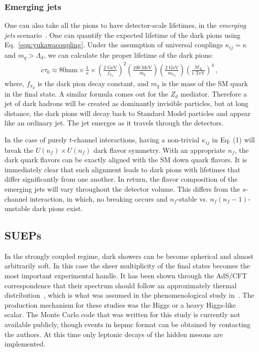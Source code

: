 \subsubsection{Emerging jets}
One can also take all the pions to have detector-scale lifetimes, in the {\em emerging jets} scenario~\cite{Schwaller:2015gea}. One can quantify the expected lifetime of the dark pions using Eq.~\ref{eqn:yukawacoupling}.  Under the assumption of universal couplings 
$\kappa_{ij} = \kappa$ and $m_{q} > \Lambda_{d}$, we can calculate the proper lifetime of the dark pions:
%
\begin{align}
	c \tau_{0} \approx 80 \mathrm{mm} \times \frac{1}{\kappa} \times \left( \frac{2 \;\mathrm{GeV}}{f_{\pi_{d}}} \right)^2 \left( \frac{100 \;\mathrm{MeV}}{m_{q}} \right) \left( \frac{2\; \mathrm{GeV}}{m_{\pi_{d} }} \right) \left( \frac{M_{X}}{1 \;\mathrm{TeV}} \right)^4 \,,
\end{align} 
where, $f_{\pi_{d}}$ is the dark pion decay constant, and $m_q$ is the mass of the SM quark in the final state.  A similar formula comes out for the $Z_d$ mediator. Therefore a jet of dark hadrons will be created as dominantly invisible particles, but at long distance, the dark pions will decay back to Standard Model particles and appear like an ordinary jet. The jet emerges as it travels through the detectors.


In the case of purely $t$-channel interactions, having a non-trivial $\kappa_{ij}$ in Eq. (1) will break the $U(n_{f}) \times U(n_{f})$ dark flavor symmetry. With an appropriate $n_{f}$, the dark quark flavors can be exactly aligned with the SM down quark flavors. It is immediately clear that such alignment leads to dark pions with lifetimes that differ significantly
from one another. In return, the flavor composition of the emerging jets will vary throughout the detector volume. This differs from the $s$-channel interaction, in which, no breaking occurs and $n_{f}$-stable vs. $n_{f}(n_{f} - 1)$-unstable dark pions exist. 

\subsection{SUEPs}
In the strongly coupled regime, dark showers can be become spherical and almost arbitrarily soft. In this case the sheer multiplicity of the final states becomes the most important experimental handle. It has been shown through the AdS/CFT correspondence that their spectrum should follow an approximately thermal distribution~\cite{Hatta:2008qx}, which is what was assumed in the phenomenological study in~\cite{Knapen:2016hky}. The production mechanism for these studies was the Higgs or a heavy Higgs-like scalar. The Monte Carlo code that was written for this study is currently not available publicly, though events in hepmc format can be obtained by contacting the authors. At this time only leptonic decays of the hidden mesons are implemented.  




